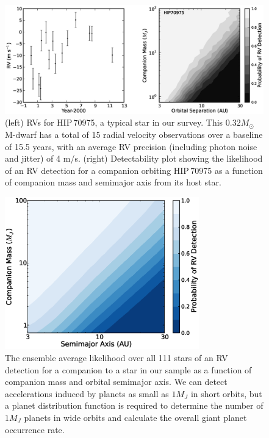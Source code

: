 \begin{figure}[htbp]
        \centering      
\centerline{\includegraphics[width=\textwidth]{chapter3/f3.eps}}
\caption[RVs and detectability contours for a typical star in the survey]{(left) RVs for HIP\,70975, a typical star in our survey. This $0.32 M_\odot$ M-dwarf has a total of 15 radial velocity observations over a baseline of 15.5 years, with an average RV precision (including photon noise and jitter) of 4 m/s. (right) Detectability plot showing the likelihood of an RV detection for a companion orbiting HIP\,70975 as a function of companion mass and semimajor axis from its host star. \newline
  }
\label{Detectability}
\end{figure}


\begin{figure}[htbp]
        \centering      
\centerline{\includegraphics[width=0.75\textwidth]{chapter3/f4.eps}}
\caption[Ensemble likelihood detectability contours for an RV companion,
averaged over all stars in the sample]{The ensemble average likelihood over all 111 stars of an RV detection for a companion to a star in our sample as a function of companion mass and orbital semimajor axis. We can detect accelerations induced by planets as small as $1 M_J$ in short orbits, but a planet distribution function is required to determine the number of $1 M_J$ planets in wide orbits and calculate the overall giant planet occurrence rate.
  }
\label{DetectFull}
\end{figure}

